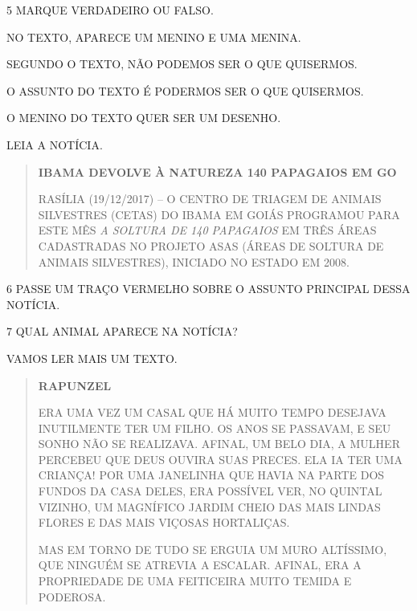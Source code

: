 
\num{5} MARQUE VERDADEIRO OU FALSO.

\begin{boxlist}
\boxitem[] NO TEXTO, APARECE UM MENINO E UMA MENINA.

\boxitem[] SEGUNDO O TEXTO, NÃO PODEMOS SER O QUE QUISERMOS.

\boxitem[] O ASSUNTO DO TEXTO É PODERMOS SER O QUE QUISERMOS.

\boxitem[] O MENINO DO TEXTO QUER SER UM DESENHO.
\end{boxlist}

LEIA A NOTÍCIA.

\begin{quote}
\textbf{IBAMA DEVOLVE À NATUREZA 140 PAPAGAIOS EM GO}

RASÍLIA (19/12/2017) -- O CENTRO DE TRIAGEM DE ANIMAIS SILVESTRES
(CETAS) DO IBAMA EM GOIÁS PROGRAMOU PARA ESTE MÊS \emph{A SOLTURA DE 140
PAPAGAIOS} EM TRÊS ÁREAS CADASTRADAS NO PROJETO ASAS (ÁREAS DE SOLTURA
DE ANIMAIS SILVESTRES), INICIADO NO ESTADO EM 2008.~

\end{quote}

\num{6} PASSE UM TRAÇO VERMELHO SOBRE O ASSUNTO PRINCIPAL DESSA NOTÍCIA.

\num{7} QUAL ANIMAL APARECE NA NOTÍCIA?


VAMOS LER MAIS UM TEXTO.

\begin{quote}
\textbf{RAPUNZEL}

ERA UMA VEZ UM CASAL QUE HÁ MUITO TEMPO DESEJAVA INUTILMENTE TER UM
FILHO. OS ANOS SE PASSAVAM, E SEU SONHO NÃO SE REALIZAVA. AFINAL, UM
BELO DIA, A MULHER PERCEBEU QUE DEUS OUVIRA SUAS PRECES. ELA IA TER UMA
CRIANÇA! POR UMA JANELINHA QUE HAVIA NA PARTE DOS FUNDOS DA CASA DELES,
ERA POSSÍVEL VER, NO QUINTAL VIZINHO, UM MAGNÍFICO JARDIM CHEIO DAS MAIS
LINDAS FLORES E DAS MAIS VIÇOSAS HORTALIÇAS.

MAS EM TORNO DE TUDO SE ERGUIA UM MURO ALTÍSSIMO, QUE NINGUÉM SE ATREVIA
A ESCALAR. AFINAL, ERA A PROPRIEDADE DE UMA FEITICEIRA MUITO TEMIDA E
PODEROSA.

\end{quote}

